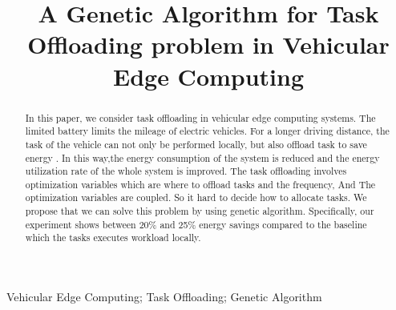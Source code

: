\documentclass[conference]{IEEEtran}
\begin{document}
\title{A Genetic Algorithm for Task Offloading problem in Vehicular Edge Computing\\
}
\author{
\and
{}
\and
{}
}

\maketitle

\begin{abstract}
In this paper, we consider task offloading in vehicular edge computing systems.
The limited battery limits the mileage of electric vehicles. 
For a longer driving distance, the task of the vehicle can not only be performed locally, but also offload  task to save energy . 
In this way,the energy consumption of the system is reduced and the energy utilization rate of the whole system is improved. 
The task offloading involves optimization variables which are where to offload tasks and the frequency, And The optimization variables are coupled.
So it hard to decide how to allocate tasks. 
We propose that we can solve this problem by using  genetic algorithm. 
Specifically, our experiment shows between 20\% and 25\% energy savings compared to the baseline which the tasks executes workload locally.
\end{abstract}

\begin{IEEEkeywords}
Vehicular Edge Computing; Task Offloading; Genetic Algorithm
\end{IEEEkeywords}
\end{document}
